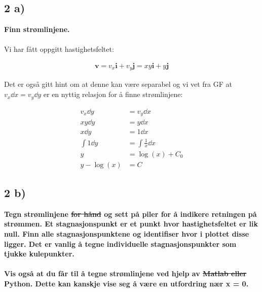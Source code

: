 \subsection*{2 a)}
\textbf{Finn strømlinjene.}
\\
\\
Vi har fått oppgitt hastighetsfeltet:

\begin{align*}
    \textbf{v} = v_x\textbf{i} + v_y \textbf{j} =  xy\textbf{i} + y \textbf{j}
\end{align*}

Det er også gitt hint om at denne kan være separabel og vi vet fra
GF at $v_x \dd x = v_y \dd y$ er en nyttig relasjon for å finne strømlinjene:

\begin{align*}
    v_x \dd y &= v_y \dd x
    \\
    xy \dd y &= y\dd x
    \\
    x\dd y &= 1\dd x
    \\
    \int 1 \dd y &= \int \frac{1}{x} \dd x
    \\
    y &= \log(x) + C_0
    \\
    y - \log(x) &= C
\end{align*}















\pagebreak
\subsection*{2 b)}

\textbf{Tegn strømlinjene \sout{for hånd} og sett på piler
for å indikere retningen på strømmen. Et stagnasjonspunkt er et
punkt hvor hastighetsfeltet er lik null. Finn alle stagnasjonspunktene
og identifiser hvor i plottet disse ligger. Det er vanlig å tegne
individuelle stagnasjonspunkter som tjukke kulepunkter.
\\
\\
Vis også at du får til å tegne strømlinjene ved hjelp av
\sout{Matlab eller} Python. Dette kan kanskje vise seg å være en utfordring nær x = 0.}

